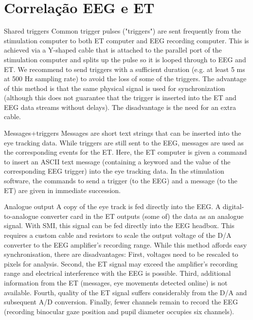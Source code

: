 \section{Correlação EEG e ET}

 Shared triggers
Common trigger pulses ("triggers") are sent frequently from the 
stimulation computer to both ET computer and EEG recording computer. 
This is achieved via a Y-shaped cable that is attached to the parallel 
port of the stimulation computer and splits up the pulse so it is looped through 
to EEG and ET. We recommend to send triggers with a sufficient duration 
(e.g. at least 5 ms at 500 Hz sampling rate) to avoid the loss of some of the triggers.
 The advantage of this method is that the same physical signal is used for 
 synchronization (although this does not guarantee that the trigger is
  inserted into the ET and EEG data streams without delays). The disadvantage
   is the need for an extra cable.

Messages+triggers
Messages are short text strings that can be inserted into the eye tracking data.
 While triggers are still sent to the EEG, messages are used as the corresponding 
 events for the ET. Here, the ET computer is given a command to insert an ASCII text 
 message (containing a keyword and the value of the corresponding EEG trigger) 
 into the eye tracking data. In the stimulation software, the commands to send a trigger
  (to the EEG) and a message (to the ET) are given in immediate succession. 

  Analogue output
  A copy of the eye track is fed directly into the EEG. A digital-to-analogue 
  converter card in the ET outputs (some of) the data as an analogue signal.
   With SMI, this signal can be fed directly into the EEG headbox. 
   This requires a custom cable and resistors to scale the output voltage 
   of the D/A converter to the EEG amplifier's recording range. While this
    method affords easy synchronisation, there are disadvantages: First, 
    voltages need to be rescaled to pixels for analysis. Second, the ET 
    signal may exceed the amplifier’s recording range and electrical 
    interference with the EEG is possible. 
    Third, additional information from the ET 
    (messages, eye movements detected online) is 
    not available. Fourth, quality of the ET signal 
    suffers considerably from the D/A and subsequent 
    A/D conversion. Finally, fewer channels remain to record
     the EEG (recording binocular gaze position and pupil diameter occupies six channels).

